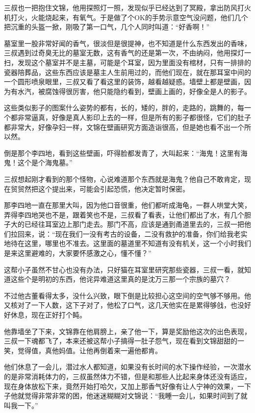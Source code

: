 三叔也一把抱住文锦，他用探照灯一照，发现似乎已经达到了冥殿，拿出防风打火机打火，火能烧起来，有氧气。于是做了个OK的手势示意空气没问题，他们几个把沉重的头盔一掀，刚吸了第一口气，几个人同时叫道：“好香啊！”

墓室里一股非常好闻的香气，很淡但是很提神，也不知道是什么东西发出的香味，三叔遇到过奇臭无比的墓室无数，这有香气的还是第一次，不由纳闷，他用探灯一扫，发现这个墓室并不是主墓，可能是个耳室，因为里面没有棺材，只有一排排的瓷器陪葬品，这些东西应该是墓主人生前用过的，而他们现在，就在那耳室中间的一个圆形喷泉眼里，三叔又看了看这里的装饰，越看越疑惑。墙壁上都是壁画，因为有水汽，被腐蚀得很厉害，他只能隐约看到，壁画上画的，好像全是人的影子。

这些类似影子的图案什么姿势的都有，长的，矮的，胖的，走路的，跳舞的，每一个都非常逼真，好像是真人影印上去的一样，但是所有的影子都很怪，它们的肚子都非常大，好像孕妇一样，文锦在壁画研究方面造诣很高，但是她也看不出一个所以然。

倒是那个李四地，看到这些壁画，吓得脸都发青了，大叫起来：“海鬼！这里有海鬼！这个是个海鬼墓。”

三叔想起刚才看到的那个怪物，心说难道那个东西就是海鬼？他自己不敢肯定，现在贸贸然把这个提出来，可能会引起恐慌，他决定暂时保密。

那李四地一直在那里大叫，因为他口音很重，他们都听成海龟，一群人哄堂大笑，弄得李四地哭也不是，跟着笑也不是，三叔看了看表，让他们都出了水，有几个胆子大的已经往耳室边上那门走去。那门不高，应该是通到甬道里去的，三叔一把他们拉回来，说：“现在我们一没有考古的设备，二没有救护的准备，你们给我老实地待在这里，哪里也不准去。这里面的墓道里不知道有没有机关，这一个小时我们是来这里避难的，大家要怀感激之心，懂不懂？”

这帮小子虽然不甘心也没有办法，只好猫在耳室里研究那些瓷器，三叔一看，就知道这些个是明初的东西，他诧异难道这里真的是沈万三那一个宗族的墓穴？

不过他古董看得太多，没什么兴致，眼下倒是比较担心这空间的空气够不够用。他又核对了一下人数，这下子对了，他松了口气，这几天他实在是累得够戗，也没好好休息，现在正好打个盹。

他靠墙坐了下来，文锦靠在他肩膀上，亲了他一下，算是奖励他这次的出色表现，三叔一下魂都飞了，本来还被这帮小子搞得一肚子怨气，现在看到文锦甜甜的一笑，觉得值，真他妈值。让他再倒着来一遍他都肯。

他们休息了一会儿，潜过水人都知道，如果没有长时间的水下操作经验，一次潜水的是非常消耗体力的，三叔虽然体力不错，但是和那些人比起来身体还没有适应，现在身体放松下来，竟然开始打哈欠，又加上那香气好像有让人宁神的效果，一下子他就觉得非常非常的困，他迷迷糊糊对文锦说：“我睡一会儿，如果时间到了就叫我一下。”

